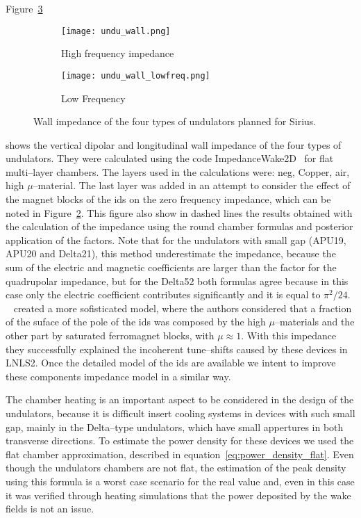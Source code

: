     Figure~\ref{fig:undu_wall}
    \begin{figure}
        \centering
        \begin{subfigure}[c]{0.65\textwidth}
            \centering
            \texttt{[image: undu\_wall.png]}
            \caption{High frequency impedance}
            \label{fig:undu_wall_highfreq}
        \end{subfigure}
        \begin{subfigure}[c]{0.34\textwidth}
            \centering
            \texttt{[image: undu\_wall\_lowfreq.png]}
            \caption{Low Frequency}
            \label{fig:undu_wall_lowfreq}
        \end{subfigure}
        \caption{Wall impedance of the four types of undulators planned for Sirius.}
        \label{fig:undu_wall}
    \end{figure}
    shows the vertical dipolar and longitudinal wall impedance of the four types of undulators. They were calculated using the code ImpedanceWake2D~\cite{Mounet2011} for flat multi--layer chambers. The layers used in the calculations were: \gls{neg}, Copper, air, high $\mu$--material. The last layer was added in an attempt to consider the effect of the magnet blocks of the \glspl{id} on the zero frequency impedance, which can be noted in Figure~\ref{fig:undu_wall_lowfreq}. This figure also show in dashed lines the results obtained with the calculation of the impedance using the round chamber formulas and posterior application of the \citeauthor{Yokoya1993} factors. Note that for the undulators with small gap (APU19, APU20 and Delta21), this method underestimate the impedance, because the sum of the electric and magnetic \citeauthor{Laslett1963} coefficients are larger than the factor for the quadrupolar impedance, but for the Delta52 both formulas agree because in this case only the electric coefficient contributes significantly and it is equal to $\pi^2/24$.
    ~ created a more sofisticated model, where the authors considered that a fraction of the suface of the pole of the \glspl{id} was composed by the high $\mu$--materials and the other part by saturated ferromagnet blocks, with $\mu\approx1$. With this impedance they successfully explained the incoherent tune--shifts caused by these devices in LNLS2. Once the detailed model of the \glspl{id} are available we intent to improve these components impedance model in a similar way.

    The chamber heating is an important aspect to be considered in the design of the undulators, because it is difficult insert cooling systems in devices with such small gap, mainly in the Delta--type undulators, which have small appertures in both transverse directions. To estimate the power density for these devices we used the flat chamber approximation, described in equation~\eqref{eq:power_density_flat}. Even though the undulators chambers are not flat, the estimation of the peak density using this formula is a worst case scenario for the real value and, even in this case it was verified through heating simulations that the power deposited by the wake fields is not an issue.

